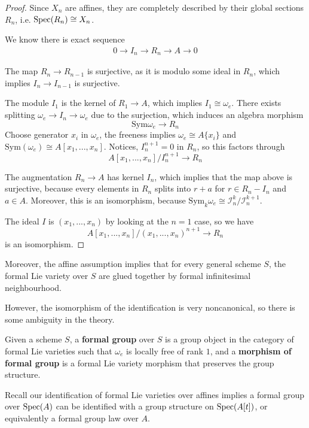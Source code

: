 \begin{proof}
    Since $X_n$ are affines, they are completely described by their global sections $R_n$, i.e. $\operatorname{\mathrm{Spec}}(R_n)\cong X_n$.

    We know there is exact sequence
    \begin{align*}
        0\to I_n\to R_n\to A\to 0
    \end{align*}

    The map $R_n\to R_{n-1}$ is surjective, as it is modulo some ideal in $R_n$, which implies $I_n\to I_{n-1}$ is surjective. 

    The module $I_1$ is the kernel of $R_1\to A$, which implies $I_1\cong \omega_e$. There exists splitting $\omega_e\to I_n\to \omega_e$ due to the surjection, which induces an algebra morphism
    \[
    \mathrm{Sym}\omega_e\to R_n
    \]
    Choose generator $x_i$ in $\omega_e$, the freeness implies $\omega_e\cong A\{x_i\}$ and $\mathrm{Sym}(\omega_e)\cong A[x_1,...,x_n]$. Notices, $I_n^{n+1}=0$ in $R_n$, so this factors through
    \[
     A[x_1,...,x_n]/I_n^{n+1}\to R_n
    \]
    
    The augmentation $R_n\to A$ has kernel $I_n$, which implies that the map above is surjective, because every elements in $R_n$ splits into $r+a$ for $r\in R_n- I_n$ and $a\in A$. Moreover, this is an isomorphism, because $\mathrm{Sym}_k \omega_e\cong \mathcal{I}_n^{k}/\mathcal{I}_n^{k+1}$.

    The ideal $I$ is $(x_1,...,x_n)$ by looking at the $n=1$ case, so we have 
    \[
    A[x_1,...,x_n]/(x_1,...,x_n)^{n+1}\to R_n
    \]is an isomorphism.
\end{proof}

Moreover, the affine assumption implies that for every general scheme $S$, the formal Lie variety over $S$ are glued together by formal infinitesimal neighbourhood.

However, the isomorphism of the identification is very noncanonical, so there is some ambiguity in the theory.

\begin{definition}
    Given a scheme $S$, a \textbf{formal group} over $S$ is a group object in the category of formal Lie varieties such that $\omega_e$ is locally free of rank $1$, and a \textbf{morphism of formal group} is a formal Lie variety morphism that preserves the group structure.
\end{definition}

\begin{remark}
    Recall our identification of formal Lie varieties over affines implies a formal group over $\operatorname{\mathrm{Spec}}(A)$ can be identified with a group structure on $\operatorname{\mathrm{Spec}}(A[t])$, or equivalently a formal group law over $A$.
\end{remark}
